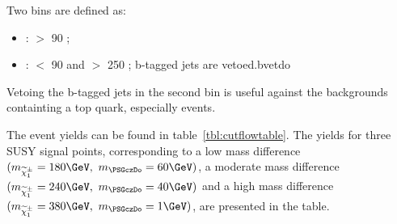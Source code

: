Two bins are defined as:
\begin{itemize}
\item {\bf\binone}: \mttwo $>$ 90 \GeV;
\item {\bf\bintwo}: \mttwo $<$ 90 \GeV and \SumMT $>$ 250 \GeV; b-tagged jets are vetoed.{\FIXME bvetdo}
\end{itemize}
Vetoing the b-tagged jets in the second bin is useful against the backgrounds containting a top quark, especially \ttbar events. 

The event yields can be found in table~\ref{tbl:cutflowtable}. The yields for three SUSY signal points, 
corresponding to a low mass difference $(m_{\chione}=180\GeV,~m_{\PSGczDo}=60\GeV)$, 
a moderate mass difference $(m_{\chione}=240\GeV,~m_{\PSGczDo}=40\GeV)$ and a high mass difference $(m_{\chione}=380\GeV,~m_{\PSGczDo}=1\GeV)$, are presented in the table.   
